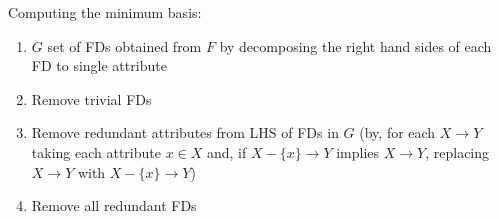 Computing the minimum basis:
\begin{enumerate}
    \item $G$ set of FDs obtained from $F$ by decomposing the right hand sides of each FD to single attribute
    \item Remove trivial FDs
    \item Remove redundant attributes from LHS of FDs in $G$ (by, for each $X \rightarrow Y$ taking each attribute $x \in X$ and,
          if $X - \{ x \} \rightarrow Y$ implies $X \rightarrow Y$, replacing $X \rightarrow Y$ with $X - \{ x \} \rightarrow Y$)
    \item Remove all redundant FDs
\end{enumerate}
